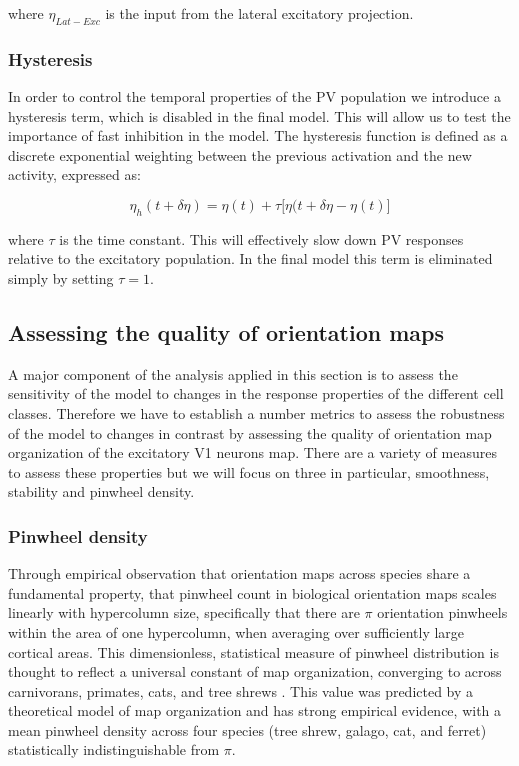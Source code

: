 where $\eta_{Lat-Exc}$ is the input from the lateral excitatory
projection.

\subsubsection{Hysteresis}

In order to control the temporal properties of the PV population we
introduce a hysteresis term, which is disabled in the final
model. This will allow us to test the importance of fast inhibition in
the model. The hysteresis function is defined as a discrete
exponential weighting between the previous activation and the new
activity, expressed as:

\begin{equation}
  \eta_h (t + \delta\eta) = \eta(t) + \tau \big[ \eta(t+\delta\eta - \eta(t) \big]
\end{equation}

where $\tau$ is the time constant. This will effectively slow down PV
responses relative to the excitatory population. In the final model
this term is eliminated simply by setting $\tau = 1$.

\subsection{Assessing the quality of orientation maps} \label{metrics}

A major component of the analysis applied in this section is to assess
the sensitivity of the model to changes in the response properties of
the different cell classes. Therefore we have to establish a number
metrics to assess the robustness of the model to changes in contrast
by assessing the quality of orientation map organization of the
excitatory V1 neurons map. There are a variety of measures to assess
these properties but we will focus on three in particular, smoothness,
stability and pinwheel density.

\subsubsection{Pinwheel density}

Through empirical observation that orientation maps across species
share a fundamental property, that pinwheel count in biological
orientation maps scales linearly with hypercolumn size, specifically
that there are $\pi$ orientation pinwheels within the area of one
hypercolumn, when averaging over sufficiently large cortical
areas. This dimensionless, statistical measure of pinwheel
distribution is thought to reflect a universal constant of map
organization, converging to across carnivorans, primates, cats, and
tree shrews \citep{Kaschube2010, Keil2012}. This value was predicted
by a theoretical model of map organization and has strong empirical
evidence, with a mean pinwheel density across four species (tree
shrew, galago, cat, and ferret) statistically indistinguishable from
$\pi$.

